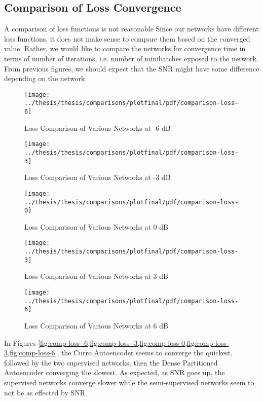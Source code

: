 \subsection{Comparison of Loss Convergence}

A comparison of loss functions is not reasonable 
Since our networks have different loss functions, it does not make sense to compare them based on the converged value. Rather, we would like to compare the networks for convergence time in terms of number of iterations, i.e. number of minibatches exposed to the network. From previous figures, we should expect that the SNR might have some difference depending on the network.

\begin{figure}[!ht]
\centering
\texttt{[image: ../thesis/thesis/comparisons/plotfinal/pdf/comparison-loss--6]}
\caption{Loss Comparison of Various Networks at -6 dB}\label{fig:comp-loss--6}
\end{figure}

\begin{figure}[!ht]
\centering
\texttt{[image: ../thesis/thesis/comparisons/plotfinal/pdf/comparison-loss--3]}
\caption{Loss Comparison of Various Networks at -3 dB}\label{fig:comp-loss--3}
\end{figure}

\begin{figure}[!ht]
\centering
\texttt{[image: ../thesis/thesis/comparisons/plotfinal/pdf/comparison-loss-0]}
\caption{Loss Comparison of Various Networks at 0 dB}\label{fig:comp-loss-0}
\end{figure}

\begin{figure}[!ht]
\centering
\texttt{[image: ../thesis/thesis/comparisons/plotfinal/pdf/comparison-loss-3]}
\caption{Loss Comparison of Various Networks at 3 dB}\label{fig:comp-loss-3}
\end{figure}

\begin{figure}[!ht]
\centering
\texttt{[image: ../thesis/thesis/comparisons/plotfinal/pdf/comparison-loss-6]}
\caption{Loss Comparison of Various Networks at 6 dB}\label{fig:comp-loss-6}
\end{figure}

In Figures \cref{fig:comp-loss--6,fig:comp-loss--3,fig:comp-loss-0,fig:comp-loss-3,fig:comp-loss-6}, the Curro Autoencoder seems to converge the quickest, followed by the two supervised networks, then the Dense Partitioned Autoencoder converging the slowest. As expected, as SNR goes up, the supervised networks converge slower while the semi-supervised networks seem to not be as effected by SNR.


